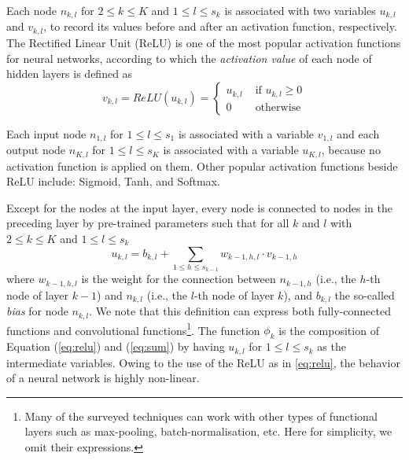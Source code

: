 Each node $n_{k,l}$ for $2 \leq k\leq K$ and  $1\leq l\leq s_k$ is associated with two variables $u_{k,l}$ and $v_{k,l}$, to record  its values before and after an activation function, respectively.
%
The Rectified Linear Unit (ReLU) \cite{relu} is one of the most popular 
activation functions for neural networks, according to which the \emph{activation 
value} of each node of hidden layers is defined as
%
\begin{equation}
    \label{eq:relu}
    v_{k,l}=ReLU(u_{k,l})=
    \begin{cases}
        u_{k,l} &\mbox{  if } u_{k,l}\geq 0 \\
            0 & \mbox{  otherwise}
    \end{cases}
\end{equation}

%
Each input node $n_{1,l}$ for $1\leq l\leq s_1$ is associated with a
variable $v_{1,l}$ and each output node $n_{K,l}$ for $1\leq l\leq s_K$ is
associated with a variable $u_{K,l}$, because no activation function is
applied on them. Other popular activation functions beside ReLU include: Sigmoid, Tanh, and Softmax. 

Except for the nodes at the input layer, every node is connected to nodes in the
preceding layer by pre-trained parameters such that for all $k$ and $l$ with
$2 \leq k\leq K$ and  $1\leq l\leq s_k$
%
\begin{equation}
  \label{eq:sum}
  u_{k,l}=b_{k,l}+\sum_{1\leq h \leq s_{k-1}} w_{k-1, h, l}\cdot v_{k-1,h}
\end{equation}
%
where $w_{k-1,h,l}$ is the weight for the connection between
$n_{k-1,h}$ (i.e., the $h$-th node of layer $k-1$) and $n_{k,l}$
(i.e., the $l$-th node of layer $k$), and $b_{k,l}$ the
so-called \emph{bias} for node $n_{k,l}$.  We note that this
definition can express both fully-connected functions and
convolutional functions\footnote{Many of the surveyed techniques can work with other types of functional layers such as max-pooling, batch-normalisation, etc. Here  for simplicity, we omit their expressions.}.
%
The function $\phi_k$ is the composition of Equation (\ref{eq:relu}) and (\ref{eq:sum}) by having $u_{k,l}$ for $1\leq l\leq s_k$ as the intermediate variables. Owing to the use of the ReLU as in \eqref{eq:relu}, the behavior of a neural
network is highly non-linear. 

